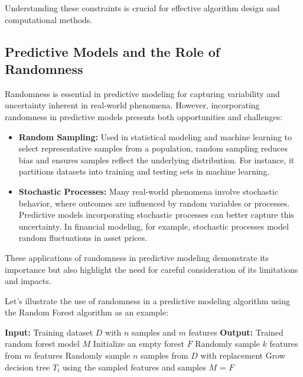 \documentclass[12pt]{book} %
\begin{document}
Understanding these constraints is crucial for effective algorithm design and computational methods.

\subsection{Predictive Models and the Role of Randomness}
Randomness is essential in predictive modeling for capturing variability and uncertainty inherent in real-world phenomena. However, incorporating randomness in predictive models presents both opportunities and challenges:

\begin{itemize}
    \item \textbf{Random Sampling:} Used in statistical modeling and machine learning to select representative samples from a population, random sampling reduces bias and ensures samples reflect the underlying distribution. For instance, it partitions datasets into training and testing sets in machine learning.
    
    \item \textbf{Stochastic Processes:} Many real-world phenomena involve stochastic behavior, where outcomes are influenced by random variables or processes. Predictive models incorporating stochastic processes can better capture this uncertainty. In financial modeling, for example, stochastic processes model random fluctuations in asset prices.
\end{itemize}

These applications of randomness in predictive modeling demonstrate its importance but also highlight the need for careful consideration of its limitations and impacts.


Let's illustrate the use of randomness in a predictive modeling algorithm using the Random Forest algorithm as an example:
\FloatBarrier
\begin{algorithm}[H]
\caption{Random Forest Algorithm}
\begin{algorithmic}[1]
\State \textbf{Input:} Training dataset \(D\) with \(n\) samples and \(m\) features
\State \textbf{Output:} Trained random forest model \(M\)
\State Initialize an empty forest \(F\)
    \State Randomly sample \(k\) features from \(m\) features
    \State Randomly sample \(n\) samples from \(D\) with replacement
    \State Grow decision tree \(T_i\) using the sampled features and samples
\EndFor
\State \(M\) = \(F\)
\end{algorithmic}
\end{algorithm}
\FloatBarrier
\end{document}
